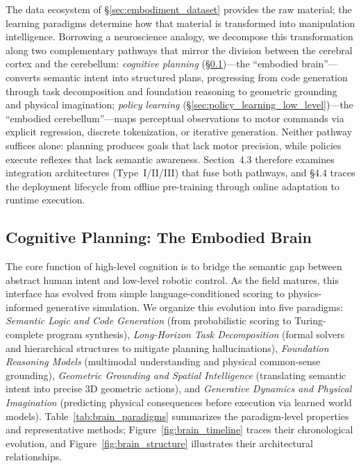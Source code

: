 \documentclass[acmsmall,screen,review,anonymous]{acmart}
\begin{document}
The data ecosystem of \S\ref{sec:embodiment_dataset} provides the raw material; the learning paradigms determine how that material is transformed into manipulation intelligence. Borrowing a neuroscience analogy, we decompose this transformation along two complementary pathways that mirror the division between the cerebral cortex and the cerebellum: \emph{cognitive planning} (\S\ref{sec:embodied_brain})---the ``embodied brain''---converts semantic intent into structured plans, progressing from code generation through task decomposition and foundation reasoning to geometric grounding and physical imagination; \emph{policy learning} (\S\ref{sec:policy_learning_low_level})---the ``embodied cerebellum''---maps perceptual observations to motor commands via explicit regression, discrete tokenization, or iterative generation. Neither pathway suffices alone: planning produces goals that lack motor precision, while policies execute reflexes that lack semantic awareness. Section~4.3 therefore examines integration architectures (Type~I/II/III) that fuse both pathways, and \S4.4 traces the deployment lifecycle from offline pre-training through online adaptation to runtime execution.

\subsection{Cognitive Planning: The Embodied Brain}\label{sec:embodied_brain}

The core function of high-level cognition is to bridge the semantic gap between abstract human intent and low-level robotic control. As the field matures, this interface has evolved from simple language-conditioned scoring to physics-informed generative simulation. We organize this evolution into five paradigms: \emph{Semantic Logic and Code Generation} (from probabilistic scoring to Turing-complete program synthesis), \emph{Long-Horizon Task Decomposition} (formal solvers and hierarchical structures to mitigate planning hallucinations), \emph{Foundation Reasoning Models} (multimodal understanding and physical common-sense grounding), \emph{Geometric Grounding and Spatial Intelligence} (translating semantic intent into precise 3D geometric actions), and \emph{Generative Dynamics and Physical Imagination} (predicting physical consequences before execution via learned world models). Table~\ref{tab:brain_paradigms} summarizes the paradigm-level properties and representative methods; Figure~\ref{fig:brain_timeline} traces their chronological evolution, and Figure~\ref{fig:brain_structure} illustrates their architectural relationships.
\end{document}
